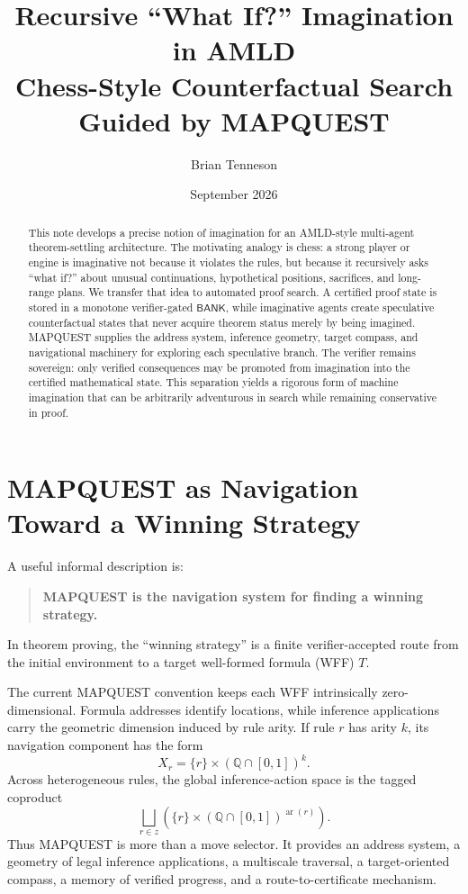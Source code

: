 \documentclass[11pt]{article}
\title{\textbf{Recursive ``What If?'' Imagination in AMLD}\\[0.4em]
\large Chess-Style Counterfactual Search Guided by MAPQUEST}
\author{Brian Tenneson}
\date{September 2026}
\newcommand{\BANK}{\ensuremath{\mathsf{BANK}}}
\begin{document}
\maketitle

\begin{abstract}
This note develops a precise notion of imagination for an AMLD-style multi-agent theorem-settling architecture. The motivating analogy is chess: a strong player or engine is imaginative not because it violates the rules, but because it recursively asks ``what if?'' about unusual continuations, hypothetical positions, sacrifices, and long-range plans. We transfer that idea to automated proof search. A certified proof state is stored in a monotone verifier-gated \BANK, while imaginative agents create speculative counterfactual states that never acquire theorem status merely by being imagined. MAPQUEST supplies the address system, inference geometry, target compass, and navigational machinery for exploring each speculative branch. The verifier remains sovereign: only verified consequences may be promoted from imagination into the certified mathematical state. This separation yields a rigorous form of machine imagination that can be arbitrarily adventurous in search while remaining conservative in proof.
\end{abstract}

\section{MAPQUEST as Navigation Toward a Winning Strategy}

A useful informal description is:
\begin{quote}
\textbf{MAPQUEST is the navigation system for finding a winning strategy.}
\end{quote}
In theorem proving, the ``winning strategy'' is a finite verifier-accepted route from the initial environment to a target well-formed formula (WFF) $T$.

The current MAPQUEST convention keeps each WFF intrinsically zero-dimensional. Formula addresses identify locations, while inference applications carry the geometric dimension induced by rule arity. If rule $r$ has arity $k$, its navigation component has the form
\[
X_r=\{r\}\times (\mathbb{Q}\cap[0,1])^k.
\]
Across heterogeneous rules, the global inference-action space is the tagged coproduct
\[
\bigsqcup_{r\in z}
\left(\{r\}\times(\mathbb{Q}\cap[0,1])^{\operatorname{ar}(r)}\right).
\]
Thus MAPQUEST is more than a move selector. It provides an address system, a geometry of legal inference applications, a multiscale traversal, a target-oriented compass, a memory of verified progress, and a route-to-certificate mechanism.
\end{document}
